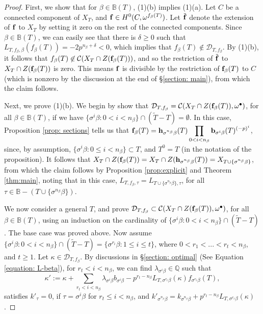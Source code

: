 \documentclass[11pt,pdflatex]{amsart}
\theoremstyle{plain}
\theoremstyle{definition}
\newcommand{\QQ}{\mathbf{Q}}
\theoremstyle{plain}
\theoremstyle{definition}
\theoremstyle{remark}
\numberwithin{equation}{section}
\numberwithin{figure}{section} \numberwithin{table}{subsection}
\newcommand{\calC}{{\mathcal{C}}}
\newcommand{\calD}{{\mathcal{D}}}
\def\BB{\mathbb{B}}
\def\QQ{\mathbb{Q}}
\begin{document}
\begin{proof} First, we show that for $\beta \in \BB(T)$,  (1)(b)  implies (1)(a). Let $C$ be a connected component of $X_T$, and ${\bf f} \in H^0(C,\omega^{f_\beta(T)})$. Let $\tilde{\bf f}$ denote the extension of ${\bf f}$ to $X_T$ by setting it zero on the rest of the connected components. Since $\beta \in \BB(T)$,  we can easily see that there is $\delta \geq 0$ such that $L_{T,f_\beta,\beta}(f_\beta(T))=-2p^{n_\beta+\delta}<0$, which implies that $f_\beta(T) \not \in \calD_{T,f_\beta}$. By  (1)(b), it follows that $f_\beta(T) \not \in \calC(X_T\cap Z({\bf f}_\beta(T)))$, and so the restriction of $\tilde{\bf f}$ to $X_T \cap Z({\bf f}_\beta(T))$ is zero. This means $\bf f$ is divisible by the restriction of ${\bf f}_\beta(T)$ to $C$ (which is nonzero by the discussion at the end of \S \ref{section: main}), from which the claim follows. 

Next, we prove (1)(b). We begin by show that  $\calD_{T,f_\beta} = \calC(X_T\cap Z({\bf f}_\beta(T)),\omega^\bullet)$, for all $\beta \in \BB(T)$, if we have   $\{\sigma^i\beta: 0 < i <n_\beta\} \cap (\tilde{T}-T)=\emptyset$. In this case, Proposition \ref{prop: sections} tells us that  ${\bf f}_\beta(T)={\bf h}_{\sigma^{n_\beta}\beta}(T)\displaystyle\prod_{0 < i < n_\beta} {\bf b}_{\sigma^{i}\beta}(T)^{(-p)^{i}}$, since, by assumption,  $\{\sigma^i\beta: 0 \leq i < n_\beta\}\subset T$, and $T^0=T$ (in the notation of the proposition). It follows that $X_T \cap Z({\bf f}_\beta(T))=X_T \cap Z({\bf h}_{\sigma^{n_\beta}\beta}(T))=X_{T \cup \{\sigma^{n_\beta}\beta\}}$, from which the claim follows by Proposition \ref{prop:explicit} and Theorem \ref{thm:main}, noting that in this case, $L_{T,f_\beta,\tau}=L_{T\cup \{\sigma^{n_\beta}\beta\},\tau}$, for all $\tau \in \BB-(T\cup\{\sigma^{n_\beta}\beta\})$.  

We now consider a general $T$, and prove  $\calD_{T,f_\beta} \subset \calC(X_T\cap Z({\bf f}_\beta(T)),\omega^\bullet)$, for all $\beta \in \BB(T)$, using an  induction on the cardinality of $\{\sigma^i\beta: 0 < i <n_\beta\} \cap (\tilde{T}-T)$. The base case was proved above.  Now assume $\{\sigma^i\beta: 0 < i < n_\beta\} \cap (\tilde{T}-T)=\{\sigma^{r_i}\beta: 1 \leq i \leq t\}$, where $0 < r_1 <...<r_t<n_\beta$, and $t\geq 1$.   Let $\kappa \in \calD_{T,f_\beta}$. By discussions in \S \ref{section: optimal} (See Equation \ref{equation: L-beta}), for $r_t<i<n_\beta$, we can find $\lambda_{\sigma^i\beta} \in \QQ$ such that 
\[
\kappa':=\kappa + \sum_{r_t <i < n_\beta} \lambda_{\sigma^i\beta} b_{\sigma^i\beta} -p^{r_t-n_\beta}L_{T,\sigma^{r_t}\beta}(\kappa)  f_{\sigma^{r_t}\beta}(T),
\]
satisfies $k'_{\tau}=0$, if $\tau=\sigma^i\beta$ for $r_t \leq i < n_\beta$, and $k'_{\sigma^{n_\beta}\beta}=k_{\sigma^{n_\beta}\beta}+p^{r_t-n_\beta}L_{T,\sigma^{r_t}\beta}(\kappa)$.


\end{proof}
\end{document}
